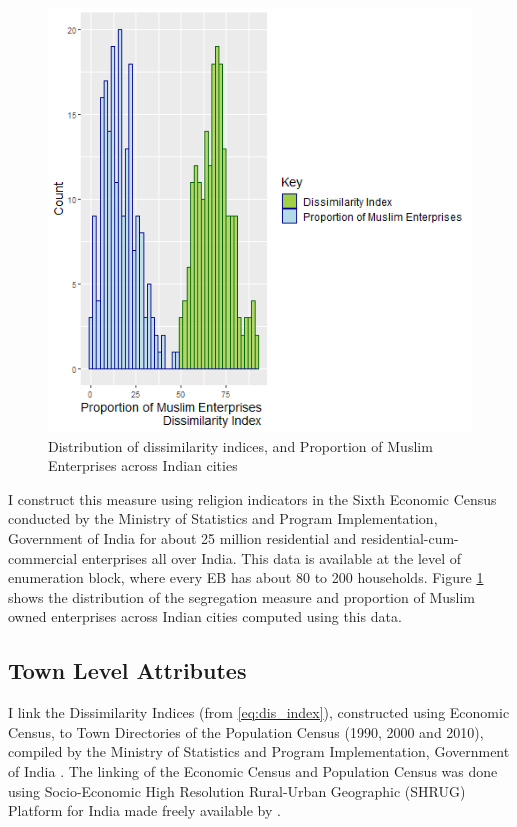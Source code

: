 \documentclass{article}
\begin{document}
\begin{figure}[h!]
    \centering
    \includegraphics[scale=0.55]{images/graph_seg_dist.png}
    \caption{Distribution of dissimilarity indices, and Proportion of Muslim Enterprises across Indian cities}
    \label{fig:seg_dist}
\end{figure}

I construct this measure using religion indicators in the Sixth Economic Census conducted by the Ministry of Statistics and Program Implementation, Government of India \citep{ec.2013} for about 25 million residential and residential-cum-commercial enterprises all over India. This data is available at the level of enumeration block, where every EB has about 80 to 200 households. Figure \ref{fig:seg_dist} shows the distribution of the segregation measure and proportion of Muslim owned enterprises across Indian cities computed using this data.

\subsection{Town Level Attributes}
I link the Dissimilarity Indices  (from \eqref{eq:dis_index}), constructed using Economic Census, to Town Directories of the Population Census (1990, 2000 and 2010), compiled by the Ministry of Statistics and Program Implementation, Government of India \citep{td.2011}. The linking of the Economic Census and Population Census was done using Socio-Economic High Resolution Rural-Urban Geographic (SHRUG) Platform for India made freely available by \cite{almn2019}.
\end{document}
